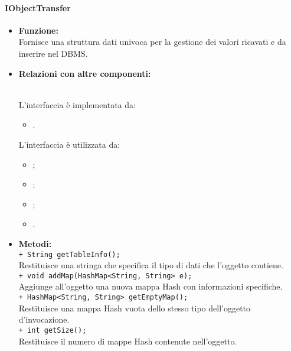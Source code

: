 {\begin{sloppypar}
{{{		\paragraph{IObjectTransfer}\label{par:IObjectTransfer}{
			\begin{itemize}

				\item[] \textbf{Funzione:}{\\
				Fornisce una struttura dati univoca per la gestione dei valori ricavati e da inserire nel DBMS\g.\\
				}
			
				\item[] \textbf{Relazioni con altre componenti:}{\\
				L’interfaccia è implementata da:
				\begin{itemize}
				 	\item[]	.
				\end{itemize} 		
				L’interfaccia è utilizzata da:
				\begin{itemize}
					\item[]	;
					\item[]	;
					\item[]	;
					\item[]	.\\
				\end{itemize}
				}
			
				\item[] \textbf{Metodi:}{ \\
				\texttt{+ String getTableInfo();}\\
				Restituisce una stringa che specifica il tipo di dati che l'oggetto contiene.\\
				
				\texttt{+ void addMap(HashMap<String, String> e);} \\ 
				Aggiunge all'oggetto una nuova mappa Hash con informazioni specifiche.\\ 
				
				\texttt{+ HashMap<String, String> getEmptyMap();} \\
				Restituisce una mappa Hash vuota dello stesso tipo dell'oggetto d'invocazione.\\ 
				
				\texttt{+ int getSize();} \\
				Restituisce il numero di mappe Hash contenute nell'oggetto.\\ 
				
}
\end{itemize}}}}}
\end{sloppypar}}
